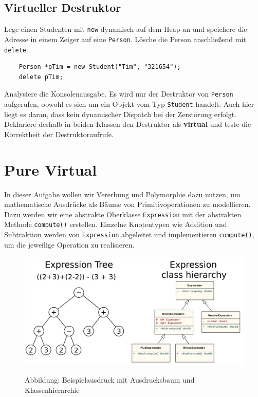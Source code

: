 
\subsection{Virtueller Destruktor}
Lege einen Studenten mit \texttt{new} dynamisch auf dem Heap an und speichere die Adresse in einem Zeiger auf eine \texttt{Person}.
Lösche die Person anschließend mit \texttt{delete}.

\begin{lstlisting}
	Person *pTim = new Student("Tim", "321654");
	delete pTim;
\end{lstlisting}

Analysiere die Konsolenausgabe.
Es wird nur der Destruktor von \texttt{Person} aufgerufen, obwohl es sich um ein Objekt vom Typ \texttt{Student} handelt.
Auch hier liegt es daran, dass kein dynamischer Dispatch bei der Zerstörung erfolgt.
Deklariere deshalb in beiden Klassen den Destruktor als \textbf{virtual} und teste die Korrektheit der Destruktoraufrufe.




\newpage

\section{Pure Virtual}
In dieser Aufgabe wollen wir Vererbung und Polymorphie dazu nutzen, um mathematische Ausdrücke als Bäume von Primitivoperationen zu modellieren.
Dazu werden wir eine abstrakte Oberklasse \texttt{Expression} mit der abstrakten Methode \texttt{compute()} erstellen.
Einzelne Knotentypen wie Addition und Subtraktion werden von \texttt{Expression} abgeleitet und implementieren \texttt{compute()}, um die jeweilige Operation zu realisieren.
\begin{figure}[h]
\begin{center}
	\includegraphics[width=.75\textwidth]{figures/ExpressionTree.png}\\
	\caption{Abbildung: Beispielausdruck mit Ausdrucksbaum und Klassenhierarchie}
\end{center}
\end{figure}



